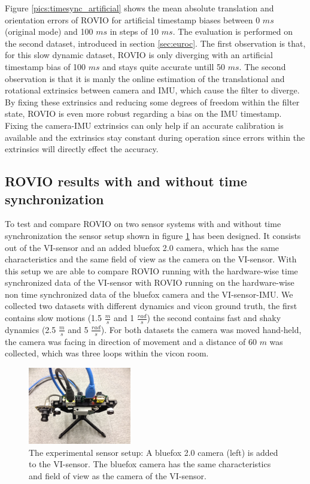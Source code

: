Figure \ref{pics:timesync_artificial} shows the mean absolute translation and orientation errors of ROVIO for artificial timestamp biases between 0 $ms$ (original mode) and 100 $ms$ in steps of 10 $ms$. The evaluation is performed on the second dataset, introduced in section \ref{sec:euroc}. The first observation is that, for this slow dynamic dataset, ROVIO is only diverging with an artificial timestamp bias of 100 $ms$ and stays quite accurate untill 50 $ms$. The second observation is that it is manly the online estimation of the translational and rotational extrinsics between camera and IMU, which cause the filter to diverge. By fixing these extrinsics and reducing some degrees of freedom within the filter state, ROVIO is even more robust regarding a bias on the IMU timestamp. Fixing the camera-IMU extrinsics can only help if an accurate calibration is available and the extrinsics stay constant during operation since errors within the extrinsics will directly effect the accuracy.



\subsection{ROVIO results with and without time synchronization}
\label{sec:timesync_real}

To test and compare ROVIO on two sensor systems with and without time synchronization the sensor setup shown in figure \ref{pics:vi_bluefox} has been designed. It consists out of the VI-sensor and an added bluefox 2.0 camera, which has the same characteristics and the same field of view as the camera on the VI-sensor. With this setup we are able to compare ROVIO running with the hardware-wise time synchronized data of the VI-sensor with ROVIO running on the hardware-wise non time synchronized data of the bluefox camera and the VI-sensor-IMU. We collected two datasets with different dynamics and vicon ground truth, the first contains slow motions (1.5 $\frac{m}{s}$ and 1 $\frac{rad}{s}$) the second contains fast and shaky dynamics (2.5 $\frac{m}{s}$ and 5 $\frac{rad}{s}$). For both datasets the camera was moved hand-held, the camera was facing in direction of movement and a distance of 60 $m$ was collected, which was three loops within the vicon room. \\

\begin{figure}[h]
   \centering
   \includegraphics[width=0.4\textwidth]{images/vi_bluefox.JPG}
   \caption{The experimental sensor setup: A bluefox 2.0 camera (left) is added to the VI-sensor. The bluefox camera has the same characteristics and field of view as the camera of the VI-sensor.}
   \label{pics:vi_bluefox}
\end{figure}

